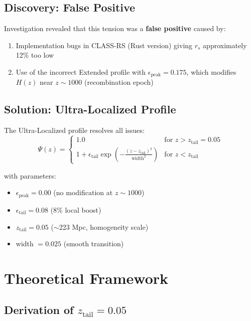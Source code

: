 \documentclass[12pt,a4paper]{article}
\begin{document}
\subsection{Discovery: False Positive}

Investigation revealed that this tension was a \textbf{false positive} caused by:
\begin{enumerate}
    \item Implementation bugs in CLASS-RS (Rust version) giving $r_s$ approximately 12\% too low
    \item Use of the incorrect Extended profile with $\epsilon_{\text{peak}} = 0.175$, which modifies $H(z)$ near $z \sim 1000$ (recombination epoch)
\end{enumerate}

\subsection{Solution: Ultra-Localized Profile}

The Ultra-Localized profile resolves all issues:
\begin{equation}
\Psi(z) = \begin{cases}
1.0 & \text{for } z > z_{\text{tail}} = 0.05 \\
1 + \epsilon_{\text{tail}} \exp\left(-\frac{(z - z_{\text{tail}})^2}{\text{width}^2}\right) & \text{for } z < z_{\text{tail}}
\end{cases}
\label{eq:psi_profile}
\end{equation}

with parameters:
\begin{itemize}
    \item $\epsilon_{\text{peak}} = 0.00$ (no modification at $z \sim 1000$)
    \item $\epsilon_{\text{tail}} = 0.08$ (8\% local boost)
    \item $z_{\text{tail}} = 0.05$ ($\sim$223 Mpc, homogeneity scale)
    \item width $= 0.025$ (smooth transition)
\end{itemize}

\section{Theoretical Framework}

\subsection{Derivation of $z_{\text{tail}} = 0.05$}
\end{document}
